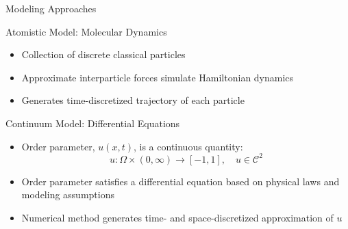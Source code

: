\documentclass[professionalfont]{beamer}
\theoremstyle{remark}
\begin{document}
\begin{frame}{Modeling Approaches}

	Atomistic Model: Molecular Dynamics
	\begin{itemize}
		\item Collection of discrete classical particles
		\item Approximate interparticle forces simulate Hamiltonian dynamics
		\item Generates time-discretized trajectory of each particle
	\end{itemize}

	Continuum Model: Differential Equations
	\begin{itemize} %
		\item Order parameter, $u(x,t)$, is a continuous quantity: \begin{equation*}
			u\colon \Omega\times(0,\infty)\to[-1,1],\quad u\in\mathcal{C}^2
		\end{equation*}
		\item Order parameter satisfies a differential equation based on physical laws and modeling assumptions
		\item Numerical method generates time- and space-discretized approximation of $u$
	\end{itemize}

\end{frame}
\end{document}
